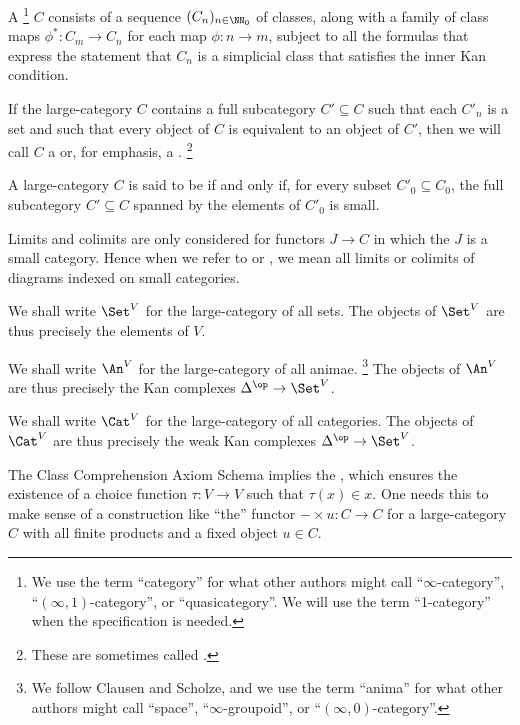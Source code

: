\begin{definition}
	A %
	\footnote{We use the term \enquote{category}
		for what other authors might call
		\enquote{$ \infty $-category},
		\enquote{$(\infty,1)$-category}, or
		\enquote{quasicategory}.
		We will use the term \enquote{1-category}
	when the specification is needed.}
	$C$ consists of a sequence $(C_n)_{n\in\NN_0}$ of classes,
	along with a family of class maps $ \phi^{\ast} \colon C_m \to C_n $ for each map $ \phi \colon n \to m $,
	subject to all the formulas that express the statement that $C_n$ is a simplicial class
	that satisfies the inner Kan condition.

	If the large-category $C$ contains a full subcategory $ C' \subseteq C $
	such that each $ C'_n $ is a set and
	such that every object of $ C $ is equivalent to an object of $ C' $,
	then we will call $ C $ a 
	or, for emphasis, a .%
	\footnote{These are sometimes called .}
	
	A large-category $ C $ is said to be  if and only if,
	for every subset $ C'_0 \subseteq C_0$,
	the full subcategory $ C' \subseteq C $ spanned by the elements of $ C'_0 $ is small.
	
	Limits and colimits are only considered for functors $ J \to C $ in which
	the $ J $ is a small category.
	Hence when we refer to  or ,
	we mean all limits or colimits of diagrams indexed on small categories.
\end{definition}

\begin{eg}
	We shall write $ \Set^V $ for the large-category of all sets.
	The objects of $ \Set^V$ are thus precisely the elements of $V$.

	We shall write $ \An^V $ for the large-category of all animae.%
	\footnote{We follow Clausen and Scholze,
		and we use the term \enquote{anima} for
		what other authors might call
		\enquote{space},
		\enquote{$ \infty $-groupoid}, or
		\enquote{$ (\infty,0) $-category}.}	
	The objects of $ \An^V $ are thus precisely
	the Kan complexes $ \Delta^{\op} \to \Set^V $.

	We shall write $ \Cat^V $ for the large-category of all categories.
	The objects of $ \Cat^V $ are thus precisely the weak Kan complexes $ \Delta^{\op} \to \Set^V $.
\end{eg}

The Class Comprehension Axiom Schema implies the ,
which ensures the existence of a choice function $ \tau \colon V \to V $ such that $ \tau(x) \in x $.
One needs this to make sense of a construction
like \enquote{the} functor $ - \times u \colon C \to C $ for a large-category $ C $
with all finite products and a fixed object $ u \in C $.

